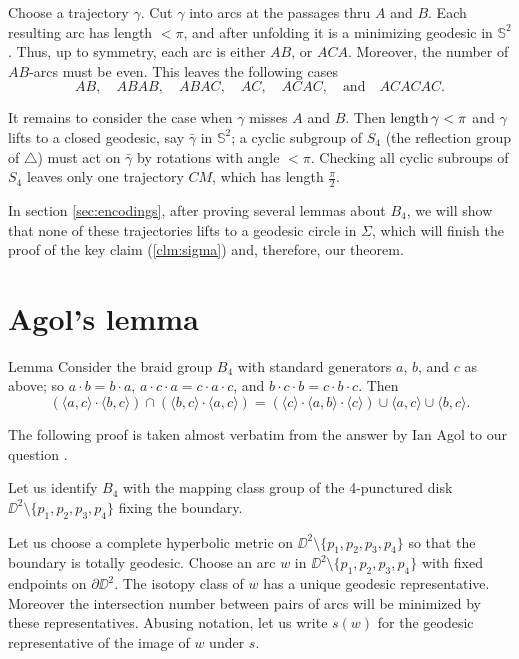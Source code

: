 \documentclass[a4paper,10pt]{article}
\begin{document}
Choose a trajectory $\gamma$.
Cut $\gamma$ into arcs at the passages thru $A$ and $B$.
Each resulting arc has length $<\pi$, and after unfolding it is a minimizing geodesic in $\mathbb{S}^2$.
Thus, up to symmetry, each arc is either $AB$, or $ACA$.
Moreover, the number of $AB$-arcs must be even.
This leaves the following cases
\[
AB,\quad ABAB,\quad ABAC,\quad AC,\quad ACAC,\quad \text{and}\quad ACACAC.
\]

It remains to consider the case when $\gamma$ misses $A$ and $B$.
Then $\mathop{\rm length}\nolimits\gamma<\pi$ and $\gamma$ lifts to a closed geodesic, say $\bar \gamma$ in $\mathbb{S}^2$;
a cyclic subgroup of $S_4$ (the reflection group of $\triangle$) must act on $\bar\gamma$ by rotations with angle $<\pi$.
Checking all cyclic subroups of $S_4$ leaves only one trajectory $CM$, which has length $\tfrac\pi2$.
\qeds

In section \ref{sec:encodings}, after proving several lemmas about $B_4$,
we will show that none of these trajectories lifts to a geodesic circle in $\Sigma$,
which will finish the proof of the key claim (\ref{clm:sigma}) and, therefore, our theorem.

\section{Agol's lemma}


\begin{thm}{Lemma}\label{lem:agol1}
Consider the braid group $B_4$ with standard generators $a$, $b$, and $c$ as above; so $a\cdot b=b\cdot a$, $a\cdot c\cdot a=c\cdot a\cdot c$, and $b\cdot c\cdot b=c\cdot b\cdot c$.
Then
\[(\langle a,c\rangle\cdot\langle b,c\rangle)\cap (\langle b,c\rangle\cdot\langle a,c\rangle)
=
(\langle c\rangle\cdot \langle a,b\rangle\cdot\langle c\rangle)\cup\langle a,c\rangle\cup \langle b,c\rangle.\]
\end{thm}

The following proof is taken almost verbatim from  the answer by Ian Agol to our question \cite{agol}.

Let us identify $B_4$ with the mapping class group of the 4-punctured disk  $\DD^2\setminus \{p_1,p_2,p_3,p_4\}$ fixing the boundary.

Let us choose a complete hyperbolic metric on $\DD^2\setminus \{p_1,p_2,p_3,p_4\}$ so that the boundary is totally geodesic.
Choose an arc $w$ in $\DD^2\setminus \{p_1,p_2,p_3,p_4\}$ with fixed endpoints on $\partial \DD^2$.
The isotopy class of $w$ has a unique geodesic representative.
Moreover the intersection number between pairs of arcs will be minimized by these representatives.
Abusing notation, let us write $s(w)$ for the geodesic representative of the image of $w$ under $s$.
\end{document}
